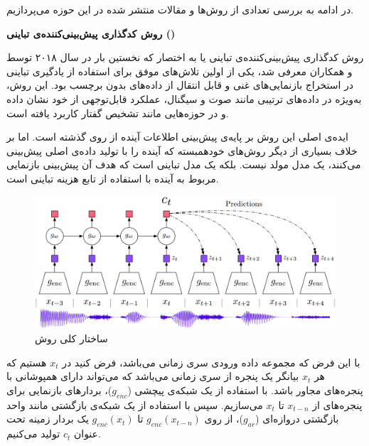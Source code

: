 در ادامه به بررسی تعدادی از روش‌ها و مقالات منتشر شده در این حوزه می‌پردازیم.\newline

\noindent\textbf{روش کدگذاری پیش‌بینی‌کننده‌ی تباینی ()}\label{sec:CPC}

روش کدگذاری پیش‌بینی‌کننده‌ی تباینی یا به اختصار 
که نخستین بار در سال ۲۰۱۸ توسط
و همکاران\cite{oord2018representation}
معرفی شد، یکی از اولین تلاش‌های موفق برای استفاده از یادگیری تباینی در استخراج بازنمایی‌های غنی و قابل انتقال از داده‌های بدون برچسب بود. این روش، به‌ویژه در داده‌های ترتیبی مانند صوت و سیگنال، عملکرد قابل‌توجهی از خود نشان داده و در حوزه‌هایی مانند تشخیص گفتار کاربرد یافته است.

ایده‌ی اصلی این روش بر پایه‌ی پیش‌بینی اطلاعات آینده از روی گذشته است. اما بر خلاف بسیاری از دیگر روش‌های
خودهمبسته
که آینده را با تولید داده‌ی اصلی پیش‌بینی می‌کنند، یک مدل مولد نیست. بلکه یک مدل تباینی است که هدف آن پیش‌بینی بازنمایی مربوط به آینده با استفاده از تابع هزینه تباینی است.

\begin{figure}[htb!]
\centering
\includegraphics[width=1\textwidth]{Images/Chapter2/cpc.png}
\caption{ساختار کلی روش }
\label{fig:cpc}
\end{figure}

با این فرض که مجموعه داده ورودی سری زمانی می‌باشد،
فرض کنید در $x_t$ هستیم
که هر $x_t$
بیانگر یک پنجره از سری زمانی می‌باشد که می‌تواند دارای همپوشانی با پنجره‌های مجاور باشد. با استفاده از یک شبکه‌ی پیچشی ($g_{enc}$)، بردارهای بازنمایی برای پنجره‌های از
$x_{t-n}$ تا $x_t$ می‌سازیم.
سپس با استفاده از یک شبکه‌ی بازگشتی مانند واحد بازگشتی دروازه‌ای ($g_{ar}$)،
از روی
$g_{enc}(x_{t-n})$ تا $g_{enc}(x_t)$
یک بردار زمینه تحت عنوان $c_t$
تولید می‌کنیم.

